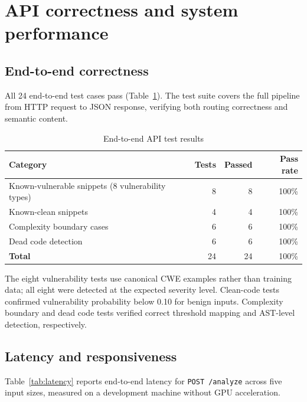 \documentclass[12pt, oneside]{report}
\begin{document}
\section{API correctness and system performance}
\label{sec:api-results}

\subsection{End-to-end correctness}

All 24 end-to-end test cases pass (Table~\ref{tab:apitest}). The test suite covers the
full pipeline from HTTP request to JSON response, verifying both routing correctness
and semantic content.

\begin{table}[H]
\centering
\caption{End-to-end API test results}
\label{tab:apitest}
\begin{tabular}{@{}lrrr@{}}
\toprule
\textbf{Category} & \textbf{Tests} & \textbf{Passed} & \textbf{Pass rate} \\
\midrule
Known-vulnerable snippets (8 vulnerability types) & 8  & 8  & 100\% \\
Known-clean snippets                               & 4  & 4  & 100\% \\
Complexity boundary cases                          & 6  & 6  & 100\% \\
Dead code detection                                & 6  & 6  & 100\% \\
\midrule
\textbf{Total}                                     & 24 & 24 & 100\% \\
\bottomrule
\end{tabular}
\end{table}

The eight vulnerability tests use canonical CWE examples rather than training data; all eight were detected at the expected severity level. Clean-code tests confirmed vulnerability probability below 0.10 for benign inputs. Complexity boundary and dead code tests verified correct threshold mapping and AST-level detection, respectively.

\subsection{Latency and responsiveness}

Table~\ref{tab:latency} reports end-to-end latency for \texttt{POST /analyze} across
five input sizes, measured on a development machine without GPU acceleration.
\end{document}
